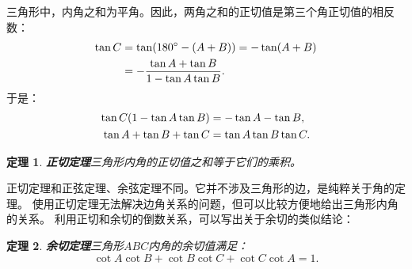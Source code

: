 \documentclass[12pt,UTF8]{ctexbook}
\newtheorem{tm}{定理}[section]
\begin{document}
三角形中，内角之和为平角。因此，两角之和的正切值是第三个角正切值的相反数：
\begin{align}
    \tan C &= \tan (180^\circ - (A + B)) = - \tan (A + B) \notag \\
    &= - \frac{\tan A + \tan B}{1 - \tan A \tan B}. \notag 
\end{align}
于是：
\begin{align}
    \tan C (1 - \tan A \tan B) &= - \tan A - \tan B, \notag \\
    \tan A + \tan B + \tan C &= \tan A \tan B \tan C. \notag
\end{align}
\begin{tm}{\textbf{正切定理}}\label{tm:2-5-10}
    三角形内角的正切值之和等于它们的乘积。
\end{tm}
正切定理和正弦定理、余弦定理不同。它并不涉及三角形的边，是纯粹关于角的定理。
使用正切定理无法解决边角关系的问题，但可以比较方便地给出三角形内角的关系。
利用正切和余切的倒数关系，可以写出关于余切的类似结论：
\begin{tm}{\textbf{余切定理}}\label{tm:2-5-20}
    三角形$ABC$内角的余切值满足：
    $$ \cot A \cot B + \cot B \cot C + \cot C \cot A = 1.$$
\end{tm}
\end{document}
